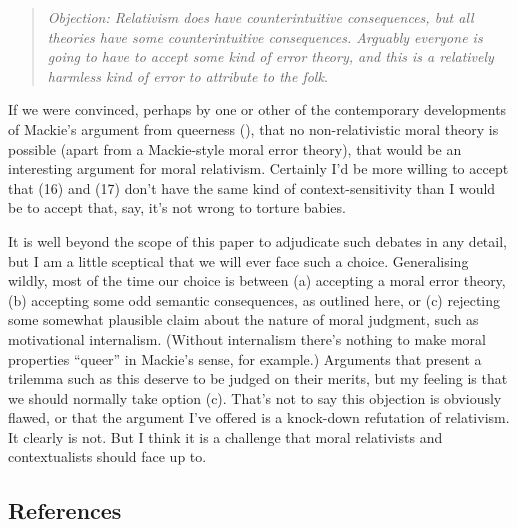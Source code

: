 \documentclass[
  11pt,
  letterpaper,
  DIV=11,
  numbers=noendperiod,
  twoside]{scrartcl}
\begin{document}
\begin{quote}
\emph{Objection: Relativism does have counterintuitive consequences, but
all theories have some counterintuitive consequences. Arguably everyone
is going to have to accept some kind of error theory, and this is a
relatively harmless kind of error to attribute to the folk}.
\end{quote}

If we were convinced, perhaps by one or other of the contemporary
developments of Mackie's argument from queerness
(), that no non-relativistic moral
theory is possible (apart from a Mackie-style moral error theory), that
would be an interesting argument for moral relativism. Certainly I'd be
more willing to accept that (16) and (17) don't have the same kind of
context-sensitivity than I would be to accept that, say, it's not wrong
to torture babies.

It is well beyond the scope of this paper to adjudicate such debates in
any detail, but I am a little sceptical that we will ever face such a
choice. Generalising wildly, most of the time our choice is between (a)
accepting a moral error theory, (b) accepting some odd semantic
consequences, as outlined here, or (c) rejecting some somewhat plausible
claim about the nature of moral judgment, such as motivational
internalism. (Without internalism there's nothing to make moral
properties ``queer'' in Mackie's sense, for example.) Arguments that
present a trilemma such as this deserve to be judged on their merits,
but my feeling is that we should normally take option (c). That's not to
say this objection is obviously flawed, or that the argument I've
offered is a knock-down refutation of relativism. It clearly is not. But
I think it is a challenge that moral relativists and contextualists
should face up to.

\subsection*{References}\label{references}
\end{document}

